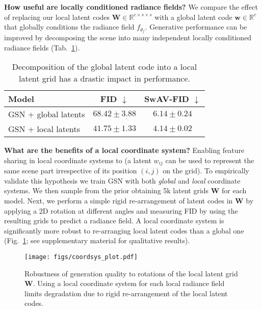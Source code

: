 \documentclass[10pt,twocolumn,letterpaper]{article}
\begin{document}
\textbf{How useful are locally conditioned radiance fields?} We compare the effect of replacing our local latent codes $\textbf{W} \in \mathbb{R}^{c \times s \times s}$ with a global latent code $\textbf{w} \in \mathbb{R}^c$ that globally conditions the radiance field $f_{\theta_f}$. Generative performance can be improved by decomposing the scene into many independent locally conditioned radiance fields (Tab.~\ref{tab:latent_code_ablation}).

\begin{table}[!h]
\small
\begin{center}
 \begin{tabular}{lcc}
 \toprule
 Model & FID $\downarrow$ & SwAV-FID $\downarrow$ \\
 \midrule
 GSN + global latents & $68.42 \pm 3.88$ & $6.14 \pm 0.24$ \\
 GSN + local latents & $41.75 \pm 1.33$ & $4.14 \pm 0.02$ \\
 \bottomrule

\end{tabular}
\end{center}
\caption{Decomposition of the global latent code into a local latent grid has a drastic impact in performance.}
\label{tab:latent_code_ablation}
\end{table}

\textbf{What are the benefits of a local coordinate system?}
Enabling feature sharing in local coordinate systems to  (\eg a latent $w_{ij}$ can be used to represent the same scene part irrespective of its position $(i, j)$ on the grid). To empirically validate this hypothesis we train GSN with both \textit{global} and \textit{local} coordinate systems. We then sample from the prior obtaining 5k latent grids $\textbf{W}$ for each model. Next, we perform a simple rigid re-arrangement of latent codes in $\textbf{W}$ by applying a 2D rotation at different angles and measuring FID by using the resulting grids to predict a radiance field. A local coordinate system is significantly more robust to re-arranging local latent codes than a global one (Fig.~\ref{fig:coordinate_system}; see supplementary material for qualitative results).

\begin{figure}[t]
    \centering
    \texttt{[image: figs/coordsys\_plot.pdf]}
    \caption{Robustness of generation quality \wrt to rotations of the local latent grid $\textbf{W}$. Using a local coordinate system for each local radiance field 
    limits degradation due to rigid re-arrangement of the local latent codes.
    }
    \label{fig:coordinate_system}
\end{figure}
\end{document}
